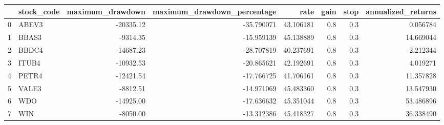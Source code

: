 \begin{tabular}{llrrrrrr}
\toprule
{} & stock\_code &  maximum\_drawdown &  maximum\_drawdown\_percentage &       rate &  gain &  stop &  annualized\_returns \\
\midrule
0 &      ABEV3 &         -20335.12 &                   -35.790071 &  43.106181 &   0.8 &   0.3 &            0.056784 \\
1 &      BBAS3 &          -9314.35 &                   -15.959139 &  45.138889 &   0.8 &   0.3 &           14.669044 \\
2 &      BBDC4 &         -14687.23 &                   -28.707819 &  40.237691 &   0.8 &   0.3 &           -2.212344 \\
3 &      ITUB4 &         -10932.53 &                   -20.865621 &  42.192691 &   0.8 &   0.3 &            4.019271 \\
4 &      PETR4 &         -12421.54 &                   -17.766725 &  41.706161 &   0.8 &   0.3 &           11.357828 \\
5 &      VALE3 &          -8812.51 &                   -14.971069 &  45.483360 &   0.8 &   0.3 &           13.547930 \\
6 &        WDO &         -14925.00 &                   -17.636632 &  45.351044 &   0.8 &   0.3 &           53.486896 \\
7 &        WIN &          -8050.00 &                   -13.312386 &  45.418327 &   0.8 &   0.3 &           36.338490 \\
\bottomrule
\end{tabular}
